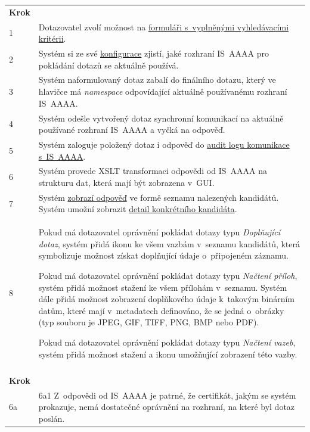 \documentclass[thesis=M,czech]{FITthesis}[2019/12/23]
\begin{document}
	\begin{longtable}{|p{}|p{}|}
		\rowcolor{Gray}\multicolumn{2}{|l|}{\textbf{Základní scénář}} \\ \hline
		\textbf{Krok} & \\ \hline
		\label{ZaslaniDoISAAA}
		1 & Dotazovatel zvolí možnost \uv{Odeslat dotaz} na \hyperref[O02Dotaz]{formuláři s~vyplněnými vyhledávacími kritérii}. \\ \hline
		2 & Systém si ze své \hyperref[Konfigurace]{konfigurace} zjistí, jaké rozhraní IS~AAAA pro pokládání dotazů se aktuálně používá. \\ \hline
		3 & Systém naformulovaný dotaz zabalí do finálního dotazu, který ve hlavičce má \textit{namespace} odpovídající aktuálně používanému rozhraní IS~AAAA. \\ \hline
		4 & Systém odešle vytvořený dotaz synchronní komunikací na aktuálně používané rozhraní IS~AAAA a vyčká na odpověď. \\ \hline
		5 & Systém zaloguje položený dotaz i odpověď do \hyperref[Logy]{audit logu komunikace s~IS~AAAA}. \\ \hline
		6 & Systém provede XSLT transformaci odpovědi od IS~AAAA na strukturu dat, která mají být zobrazena v~GUI. \\ \hline
		7 & Systém \hyperref[O03OdpovedNaDotaz]{zobrazí odpověď} ve formě seznamu nalezených kandidátů. Systém umožní zobrazit \hyperref[O04DetailKandidata]{detail konkrétního kandidáta}. \\ \hline
		8 & Pokud má dotazovatel oprávnění pokládat dotazy typu \textit{Doplňující dotaz}, systém přidá ikonu ke všem vazbám v~seznamu kandidátů, která symbolizuje možnost získat doplňující údaje o~připojeném záznamu.

Pokud má dotazovatel oprávnění pokládat dotazy typu \textit{Načtení příloh}, systém přidá možnost stažení ke všem přílohám v~seznamu. Systém dále přidá možnost zobrazení doplňkového údaje k~takovým binárním datům, které mají v~metadatech definováno, že se jedná o~obrázky (typ souboru je JPEG, GIF, TIFF, PNG, BMP nebo PDF).

Pokud má dotazovatel oprávnění pokládat dotazy typu \textit{Načtení vazeb}, systém přidá možnost stažení a ikonu umožňující zobrazení této vazby.  \\ \hline
		\rowcolor{Gray}\multicolumn{2}{|l|}{\textbf{Alternativní scénáře}} \\ \hline
		\textbf{Krok} & \\ \hline
		6a &
		6a1 Z~odpovědi od IS~AAAA je patrné, že certifikát, jakým se systém prokazuje, nemá dostatečné oprávnění na rozhraní, na které byl dotaz poslán.


\end{longtable}
\end{document}
